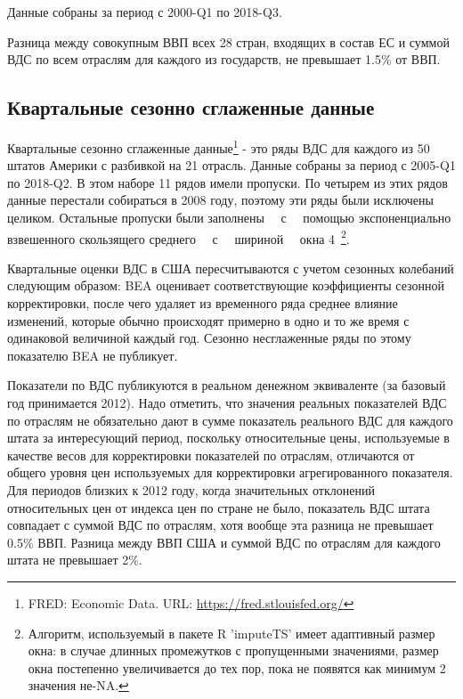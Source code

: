 \documentclass[12pt,a4paper, oneside]{extreport}
\begin{document}
Данные собраны за период с 2000-Q1 по 2018-Q3. 




Разница между совокупным ВВП всех 28 стран, входящих в состав ЕС  и суммой ВДС по всем отраслям для каждого из государств, не превышает  1.5\% от ВВП. 

\subsection{Квартальные сезонно сглаженные данные}

Квартальные сезонно сглаженные данные\footnote{FRED: Economic Data. URL: \url{https://fred.stlouisfed.org/}} - это ряды ВДС  для каждого из 50 штатов Америки с разбивкой на 21 отрасль.  Данные собраны за период с 2005-Q1 по 2018-Q2. 
В этом наборе 11 рядов имели пропуски. По четырем из этих рядов  данные перестали собираться в 2008 году, поэтому эти ряды были исключены целиком. Остальные пропуски  были заполнены \ \ с \ \ помощью экспоненциально взвешенного скользящего среднего \ \  с \ \  шириной \  \  окна 4~\footnote{Алгоритм, используемый в пакете R 'imputeTS'   имеет адаптивный размер окна: в случае длинных промежутков с пропущенными значениями, размер окна постепенно увеличивается до тех пор, пока не появятся как минимум 2 значения не-NA. }. 

Квартальные оценки ВДС в США пересчитываются с учетом сезонных колебаний следующим образом: BEA оценивает соответствующие коэффициенты сезонной корректировки, после чего удаляет из временного ряда среднее влияние изменений, которые обычно происходят примерно в одно и то же время  с одинаковой величиной каждый год. Сезонно несглаженные ряды по этому показателю BEA не публикует.

Показатели по ВДС публикуются в реальном денежном эквиваленте (за базовый год принимается 2012).
Надо отметить, что  значения реальных показателей ВДС по отраслям не обязательно дают в сумме показатель реального ВДС для каждого штата за интересующий период, поскольку относительные цены, используемые в качестве весов для корректировки показателей по отраслям, отличаются от общего уровня цен используемых для корректировки агрегированного показателя. 
Для периодов близких к 2012 году, когда значительных отклонений относительных цен от индекса цен по стране не было, показатель ВДС штата совпадает с суммой ВДС по отраслям, хотя  вообще эта разница не превышает 0.5\% ВВП.
Разница между ВВП США и суммой ВДС по отраслям для каждого штата не превышает 2\%. 
\end{document}
